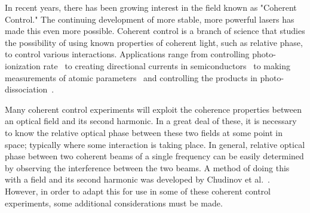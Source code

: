 \begin{preface}
%
%
%

In recent years, there has been growing interest in the field
known as "Coherent Control."   The continuing development of more
stable, more powerful lasers has made this even more possible.
Coherent control is a branch of science that studies the
possibility of using known properties of coherent light, such as
relative phase, to control various interactions. Applications
range from controlling photo-ionization rate~\cite{Schumacher,
Schumacher1} to creating directional currents in
semiconductors~\cite{Dupont, vanDriel} to making measurements of
atomic parameters~\cite{Wang3} and controlling the products in
photo-dissociation~\cite{Yin, Sheehy}.


Many coherent control experiments will exploit the coherence
properties between an optical field and its second harmonic.  In a
great deal of these, it is necessary to know the relative optical
phase between these two fields at some point in space; typically
where some interaction is taking place.  In general, relative
optical phase between two coherent beams of a single frequency can
be easily determined by observing the interference between the two
beams.  A method of doing this with a field and its second
harmonic was developed by Chudinov et al.~\cite{Chudinov}.
However, in order to adapt this for use in some of these coherent
control experiments, some additional considerations must be made.



\end{preface}

\tableofcontents

